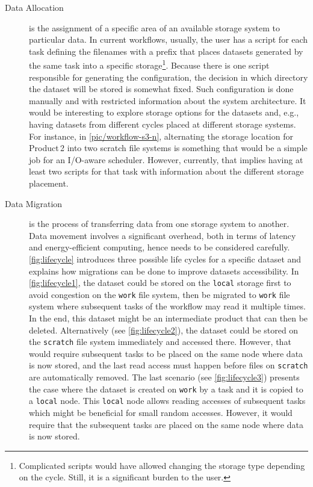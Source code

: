 \documentclass{superfri}
\begin{document}
\begin{description}

\item[Data Allocation] is the assignment of a specific area of an available storage system to particular data.
In current workflows, usually, the user has a script for each task defining the filenames with a prefix that places datasets generated by the same task into a specific storage\footnote{Complicated scripts would have allowed changing the storage type depending on the cycle. Still, it is a significant burden to the user.}.
Because there is one script responsible for generating the configuration, the decision in which directory the dataset will be stored is somewhat fixed.
Such configuration is done manually and with restricted information about the system architecture.
It would be interesting to explore storage options for the datasets and, e.g., having datasets from different cycles placed at different storage systems.
For instance, in \cref{pic/workflow-s3-n}, alternating the storage location for Product\,2 into two scratch file systems is something that would be a simple job for an I/O-aware scheduler.
However, currently, that implies having at least two scripts for that task with information about the different storage placement.

\item[Data Migration] is the process of transferring data from one storage system to another.
Data movement involves a significant overhead, both in terms of latency and energy-efficient computing, hence needs to be considered carefully.
\cref{fig:lifecycle} introduces three possible life cycles for a specific dataset and explains how migrations can be done to improve datasets accessibility.
In \cref{fig:lifecycle1}, the dataset could be stored on the \texttt{local} storage first to avoid congestion on the \texttt{work} file system, then be migrated to \texttt{work} file system where subsequent tasks of the workflow may read it multiple times.
In the end, this dataset might be an intermediate product that can then be deleted.
Alternatively (see \cref{fig:lifecycle2}), the dataset could be stored on the \texttt{scratch} file system immediately and accessed there.
However, that would require subsequent tasks to be placed on the same node where data is now stored, and the last read access must happen before files on \texttt{scratch} are automatically removed.
The last scenario (see \cref{fig:lifecycle3}) presents the case where the dataset is created on \texttt{work} by a task and it is copied to a \texttt{local} node.
This \texttt{local} node allows reading accesses of subsequent tasks which might be beneficial for small random accesses.
However, it would require that the subsequent tasks are placed on the same node where data is now stored.


\end{description}
\end{document}
